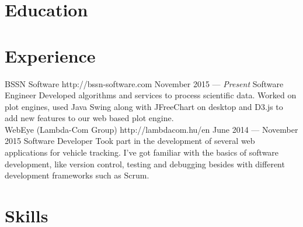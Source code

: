 \documentclass{resume}
\begin{document}

\smallskip

\section{Education}


\section{Experience}

\employer
	{BSSN Software}
	{http://bssn-software.com}
	{November 2015 --- \emph{Present}}
	{Software Engineer}
	{Developed algorithms and services to process scientific data. Worked on plot engines, used Java Swing along with JFreeChart on desktop and D3.js to add new features to our web based plot engine.\\}
\employer
	{WebEye (Lambda-Com Group)}
	{http://lambdacom.hu/en}
	{June 2014 --- November 2015}
	{Software Developer}
	{Took part in the development of several web applications for vehicle tracking. I've got familiar with the basics of software development, like version control, testing and debugging besides with different development frameworks such as Scrum.}
	
\section{Skills}

\end{document}
